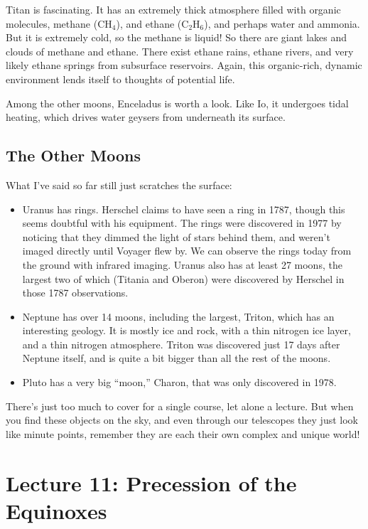 \documentclass[12pt, preprint]{aastex}
\begin{document}
Titan is fascinating. It has an extremely thick atmosphere filled with
organic molecules, methane (CH$_4$), and ethane (C$_2$H$_6$), and
perhaps water and ammonia. But it is extremely cold, so the methane is
liquid! So there are giant lakes and clouds of methane and
ethane. There exist ethane rains, ethane rivers, and very likely
ethane springs from subsurface reservoirs. Again, this organic-rich,
dynamic environment lends itself to thoughts of potential life.

Among the other moons, Enceladus is worth a look. Like Io, it
undergoes tidal heating, which drives water geysers from underneath
its surface.

\subsection{The Other Moons}

What I've said so far still just scratches the surface:
\begin{itemize}
\item Uranus has rings. Herschel claims to have seen a ring in 1787,
  though this seems doubtful with his equipment. The rings were
  discovered in 1977 by noticing that they dimmed the light of stars
  behind them, and weren't imaged directly until Voyager flew by. We
  can observe the rings today from the ground with infrared
  imaging. Uranus also has at least 27 moons, the largest two of which
  (Titania and Oberon) were discovered by Herschel in those 1787
  observations.
  \item Neptune has over 14 moons, including the largest, Triton,
    which has an interesting geology. It is mostly ice and rock, with
    a thin nitrogen ice layer, and a thin nitrogen atmosphere. Triton
    was discovered just 17 days after Neptune itself, and is quite a
    bit bigger than all the rest of the moons.
    \item Pluto has a very big ``moon,'' Charon, that was only
      discovered in 1978.
\end{itemize}

There's just too much to cover for a single course, let alone a
lecture. But when you find these objects on the sky, and even through
our telescopes they just look like minute points, remember they are
each their own complex and unique world!

\clearpage

\section{Lecture 11: Precession of the Equinoxes}
\end{document}
